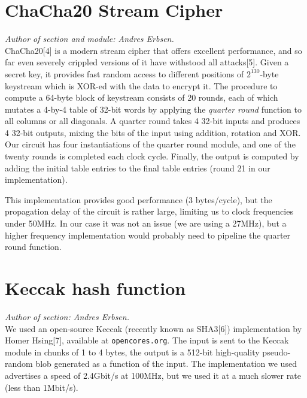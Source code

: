 \section{ChaCha20 Stream Cipher}\label{chacha20-stream-cipher}

\emph{Author of section and module: Andres Erbsen.}\\ChaCha20{[}4{]} is
a modern stream cipher that offers excellent performance, and so far
even severely crippled versions of it have withstood all attacks{[}5{]}.
Given a secret key, it provides fast random access to different
positions of \(2^{130}\)-byte keystream which is XOR-ed with the data to
encrypt it. The procedure to compute a 64-byte block of keystream
consists of 20 rounds, each of which mutates a 4-by-4 table of 32-bit
words by applying the \emph{quarter round} function to all columns or
all diagonals. A quarter round takes 4 32-bit inputs and produces 4
32-bit outputs, mixing the bits of the input using addition, rotation
and XOR. Our circuit has four instantiations of the quarter round
module, and one of the twenty rounds is completed each clock cycle.
Finally, the output is computed by adding the initial table entries to
the final table entries (round 21 in our implementation).

This implementation provides good performance (3 bytes/cycle), but the
propagation delay of the circuit is rather large, limiting us to clock
frequencies under 50MHz. In our case it was not an issue (we are using a
27MHz), but a higher frequency implementation would probably need to
pipeline the quarter round function.

\section{Keccak hash function}\label{keccak-hash-function}

\emph{Author of section: Andres Erbsen.}\\We used an open-source Keccak
(recently known as SHA3{[}6{]}) implementation by Homer Hsing{[}7{]},
available at \texttt{opencores.org}. The input is sent to the Keccak
module in chunks of 1 to 4 bytes, the output is a 512-bit high-quality
pseudo-random blob generated as a function of the input. The
implementation we used advertises a speed of 2.4Gbit/s at 100MHz, but we
used it at a much slower rate (less than 1Mbit/s).
